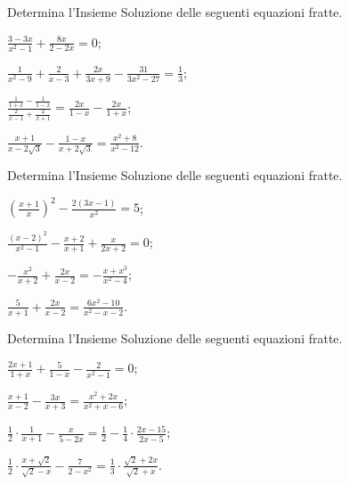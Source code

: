 \begin{esercizio}[\Ast]
 \label{ese:3.44}
Determina l'Insieme Soluzione delle seguenti equazioni fratte.
\begin{multicols}{2}
\begin{enumeratea}
\item $\frac{3-3 x}{x^{2}-1} + \frac{8 x}{2-2 x} = 0$;
\item $\frac{1}{x^{2}-9} + \frac{2}{x-3} + \frac{2 x}{3 x + 9} -\frac{31}{3 x^{2}-27} = \frac{1}{3}$;
\item $\frac{\frac{1}{1 + x}-\frac{1}{1-x}}{\frac{2}{x-1} +\frac{2}{x + 1}} = \frac{2 x}{1-x}-\frac{2 x}{1 + x}$;
\item $\frac{x + 1}{x-2 \sqrt{3}}-\frac{1-x}{x + 2 \sqrt{3}} =\frac{x^{2} + 8}{x^{2}-12}$.
\end{enumeratea}
\end{multicols}
\end{esercizio}

\begin{esercizio}[\Ast]
 \label{ese:3.45}
Determina l'Insieme Soluzione delle seguenti equazioni fratte.
\begin{multicols}{2}
\begin{enumeratea}
\item $\left(\frac{x + 1}{x} \right)^{2}-\frac{2 (3 x-1)}{x^{2}} = 5$;
\item $\frac{(x-2)^{2}}{x^{2}-1}-\frac{x + 2}{x + 1} +\frac{x}{2 x + 2} = 0$;
\item $- \frac{x^{2}}{x + 2} + \frac{2 x}{x-2} =-\frac{x + x^{3}}{x^{2}-4}$;
\item $\frac{5}{x + 1} + \frac{2 x}{x-2} = \frac{6 x^{2}-10}{x^{2}-x-2}$.
\end{enumeratea}
\end{multicols}
\end{esercizio}

\begin{esercizio}[\Ast]
 \label{ese:3.46}
Determina l'Insieme Soluzione delle seguenti equazioni fratte.
\begin{multicols}{2}
\begin{enumeratea}
\item $\frac{2 x + 1}{1 + x} + \frac{5}{1-x}-\frac{2}{x^{2}-1}= 0$;
\item $\frac{x + 1}{x-2}-\frac{3 x}{x + 3} = \frac{x^{2} + 2 x}{x^{2} + x-6}$;
\item $\frac{1}{2}\cdot\frac{1}{x+1}-\frac{x}{5-2x} = \frac{1}{2}-\frac{1}{4}\cdot\frac{2x-15}{2x-5}$; %
\item $\frac{1}{2}\cdot\frac{x+\sqrt{2}}{\sqrt{2}-x}-\frac{7}{2-x^{2}} = \frac{1}{3}\cdot\frac{\sqrt{2}+2x}{\sqrt{2}+x}$.
\end{enumeratea}
\end{multicols}
\end{esercizio}

